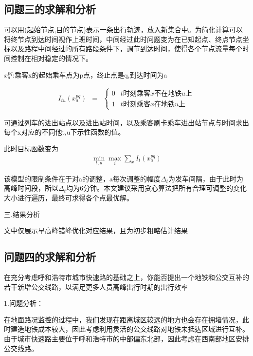 \documentclass[12pt,a4paper]{mcmthesis}
\begin{document}
    \subsection{问题三的求解和分析}

    可以用(起始节点,目的节点)表示一条出行轨迹，放入新集合中。为简化计算可以将终节点到达时间视作上班时间，中间经过此时问题变为在已知起点、终点节点坐标以及路程中间经过的所有路段条件下，调节到达时间，使得各个节点流量每个时间控制在相对稳定的情况下。

    $x_{a}^{pq}$:乘客x的起始乘车点为p点，终止点是q,到达时间为a

    \begin{eqnarray}
        I_{tu}(x_{a}^{pq}) & = & \left\{\begin{matrix}
                                            0& t时刻乘客x不在地铁u上 \\
                                            1& t时刻乘客x在地铁u上
        \end{matrix}\right.
    \end{eqnarray}

    可通过列车的进出站点以及进出站时间，以及乘客刷卡乘车进出站节点与时间求出每个x对应的不同他t,u下示性函数的值。

    此时目标函数变为
    \begin{align}
        \min_{t,u}\max_{i} \sum_{x} I_{t}(x_{a}^{pq})
    \end{align}

    该模型的限制条件在于对a的调整，a每次调整的幅度$\Delta _{t}$为发车间隔，由于此时为高峰时间段，所以$\Delta _{t}$均为6分钟。本文建议采用贪心算法把所有合理可调整的变化大小进行遍历，最终可求得各个点最优解。

    三.结果分析

    文中仅展示早高峰错峰优化对应结果，且为初步粗略估计结果

    \subsection{问题四的求解和分析}

    在充分考虑呼和浩特市城市快速路的基础之上，你能否提出一个地铁和公交互补的若干新增公交线路，以满足更多人员高峰出行时期的出行效率

    1.问题分析：

    在地面路况监控的过程中，我们发现在距离城区较远的地方也会存在拥堵情况，此时建造地铁成本较大，因此考虑利用灵活的公交线路对地铁未抵达区域进行互补。由于城市快速路主要位于呼和浩特市的中部偏东北部，因此考虑在西南部地区安排公交线路。
\end{document}
